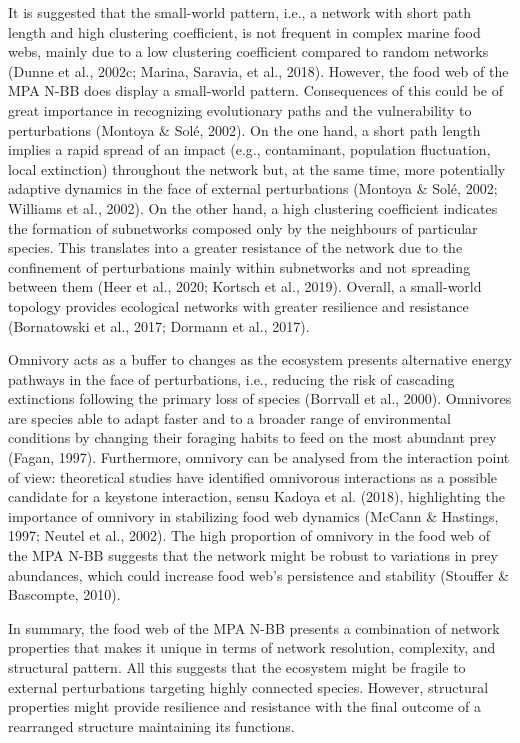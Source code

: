 \documentclass[preprint, 3p,
authoryear]{elsarticle} %
\begin{document}
It is suggested that the small-world pattern, i.e., a network with short
path length and high clustering coefficient, is not frequent in complex
marine food webs, mainly due to a low clustering coefficient compared to
random networks (Dunne et al., 2002c; Marina, Saravia, et al., 2018).
However, the food web of the MPA N-BB does display a small-world
pattern. Consequences of this could be of great importance in
recognizing evolutionary paths and the vulnerability to perturbations
(Montoya \& Solé, 2002). On the one hand, a short path length implies a
rapid spread of an impact (e.g., contaminant, population fluctuation,
local extinction) throughout the network but, at the same time, more
potentially adaptive dynamics in the face of external perturbations
(Montoya \& Solé, 2002; Williams et al., 2002). On the other hand, a
high clustering coefficient indicates the formation of subnetworks
composed only by the neighbours of particular species. This translates
into a greater resistance of the network due to the confinement of
perturbations mainly within subnetworks and not spreading between them
(Heer et al., 2020; Kortsch et al., 2019). Overall, a small-world
topology provides ecological networks with greater resilience and
resistance (Bornatowski et al., 2017; Dormann et al., 2017).

Omnivory acts as a buffer to changes as the ecosystem presents
alternative energy pathways in the face of perturbations, i.e., reducing
the risk of cascading extinctions following the primary loss of species
(Borrvall et al., 2000). Omnivores are species able to adapt faster and
to a broader range of environmental conditions by changing their
foraging habits to feed on the most abundant prey (Fagan, 1997).
Furthermore, omnivory can be analysed from the interaction point of
view: theoretical studies have identified omnivorous interactions as a
possible candidate for a keystone interaction, sensu Kadoya et al.
(2018), highlighting the importance of omnivory in stabilizing food web
dynamics (McCann \& Hastings, 1997; Neutel et al., 2002). The high
proportion of omnivory in the food web of the MPA N-BB suggests that the
network might be robust to variations in prey abundances, which could
increase food web's persistence and stability (Stouffer \& Bascompte,
2010).

In summary, the food web of the MPA N-BB presents a combination of
network properties that makes it unique in terms of network resolution,
complexity, and structural pattern. All this suggests that the ecosystem
might be fragile to external perturbations targeting highly connected
species. However, structural properties might provide resilience and
resistance with the final outcome of a rearranged structure maintaining
its functions.
\end{document}
